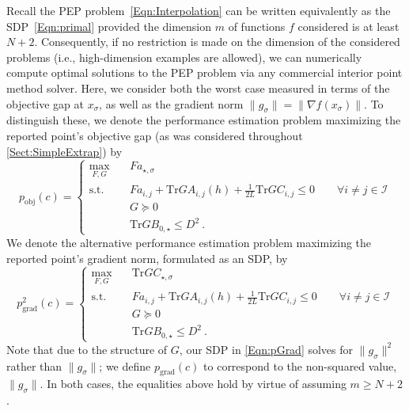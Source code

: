 \documentclass[11pt]{article}
\numberwithin{equation}{section}
\newcommand{\Tr}{\text{Tr}}
\theoremstyle{definition}
\theoremstyle{definition}
\theoremstyle{definition}
\newcommand{\1}{\mathbf{1}}
\newcommand{\xSpecial}{x_\sigma}
\newcommand{\idxSpecial}{\sigma}
\newcommand{\gSpecial}{g_\sigma}
\newcommand{\dimension}{m}
\begin{document}
Recall the PEP problem~\eqref{Eqn:Interpolation} can be written equivalently as the SDP~\eqref{Eqn:primal} provided the dimension $\dimension$ of functions $f$ considered is at least $N+2$. Consequently, if no restriction is made on the dimension of the considered problems (i.e., high-dimension examples are allowed), we can numerically compute optimal solutions to the PEP problem via any commercial interior point method solver. Here, we consider both the worst case measured in terms of the objective gap at $\xSpecial$, as well as the gradient norm $\|\gSpecial\| = \| \nabla f(\xSpecial)\|$. To distinguish these, we denote the performance estimation problem maximizing the reported point's objective gap (as was considered throughout \cref{Sect:SimpleExtrap}) by
\begin{equation}\label{Eqn:pObj}
    p_{\text{obj}}(c) = \begin{cases} \max_{F,G} \quad & F a_{\star,\idxSpecial} \\
                    \text{s.t. } & Fa_{i,j}+\Tr G A_{i,j}(h) + \frac{1}{2L}\Tr G C_{i,j} \leq 0  \quad \quad \forall i\neq j \in \mathcal{I}\\
                    & G \succeq 0 \\
                    & \Tr G B_{0,\star} \leq D^2 \ . 
                \end{cases}
\end{equation}
We denote the alternative performance estimation problem maximizing the reported point's gradient norm, formulated as an SDP, by
\begin{equation}    \label{Eqn:pGrad}
    p^2_{\text{grad}}(c) = \begin{cases} \max_{F,G} \quad & \Tr G C_{\star,\idxSpecial} \\
                    \text{s.t. } & Fa_{i,j} + \Tr G A_{i,j}(h) + \frac{1}{2L}\Tr G C_{i,j} \leq 0 \quad \quad \forall i \neq j \in \mathcal{I}\\
                    & G \succeq 0 \\
                    & \Tr G B_{0,\star} \leq D^2  \ . 
                \end{cases}
\end{equation}
Note that due to the structure of $G$, our SDP in 
\eqref{Eqn:pGrad} solves for $\|g_\sigma\|^2$ rather than $\|g_\sigma\|$; we define $p_{\text{grad}}(c)$ to correspond to the non-squared value, $\|g_\sigma\|$.
In both cases, the equalities above hold by virtue of assuming $m\geq N+2$.
\end{document}
